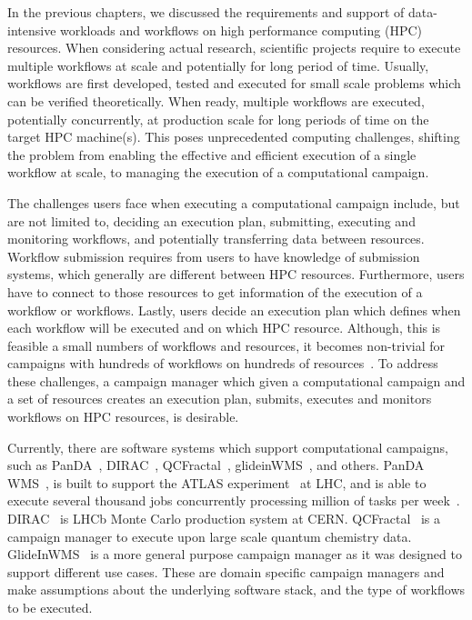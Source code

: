 \label{ch:cmanager}

In the previous chapters, we discussed the requirements and support of data-intensive workloads and workflows on high performance computing (HPC) resources. 
When considering actual research, scientific projects require to execute multiple workflows at scale and potentially for long period of time.
Usually, workflows are first developed, tested and executed for small scale problems which can be verified theoretically.
When ready, multiple workflows are executed, potentially concurrently, at production scale for long periods of time on the target HPC machine(s). 
This poses unprecedented computing challenges, shifting the problem from enabling the effective and efficient execution of a single workflow at scale, to managing the execution of a computational campaign.

The challenges users face when executing a computational campaign include, but are not limited to, deciding an execution plan, submitting, executing and monitoring workflows, and potentially transferring data between resources.
Workflow submission requires from users to have knowledge of submission systems, which generally are different between HPC resources.
Furthermore, users have to connect to those resources to get information of the execution of a workflow or workflows.
Lastly, users decide an execution plan which defines when each workflow will be executed and on which HPC resource.
Although, this is feasible a small numbers of workflows and resources, it becomes non-trivial for campaigns with hundreds of workflows on hundreds of resources~\cite{smith2020molssi}.
To address these challenges, a campaign manager which given a computational campaign and a set of resources creates an execution plan, submits, executes and monitors workflows on HPC resources, is desirable.

Currently, there are software systems which support computational campaigns, such as PanDA~\cite{maeno2008panda}, DIRAC~\cite{casajus2010dirac}, QCFractal~\cite{qcfractal}, glideinWMS~\cite{sfiligoi2008glidein}, and others.
PanDA WMS~\cite{maeno2008panda}, is built to support the ATLAS experiment~\cite{atlas} at LHC, and is able to execute several thousand jobs concurrently processing million of tasks per week~\cite{de2015future}.
DIRAC~\cite{tsaregorodtsev2003dirac} is LHCb Monte Carlo production system at CERN.
QCFractal~\cite{qcfractal} is a campaign manager to execute upon large scale quantum chemistry data.
GlideInWMS~\cite{sfiligoi2008glidein} is a more general purpose campaign manager as it was designed to support different use cases.
These are domain specific campaign managers and make assumptions about the underlying software stack, and the type of workflows to be executed.

